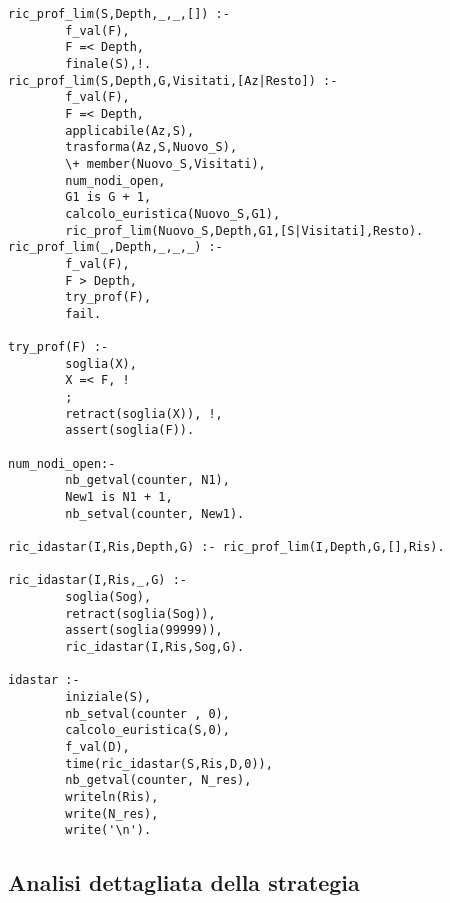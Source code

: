 \begin{lstlisting}
ric_prof_lim(S,Depth,_,_,[]) :-
        f_val(F),
        F =< Depth,
        finale(S),!.
ric_prof_lim(S,Depth,G,Visitati,[Az|Resto]) :-
        f_val(F),
        F =< Depth,
        applicabile(Az,S),
        trasforma(Az,S,Nuovo_S),
        \+ member(Nuovo_S,Visitati),
        num_nodi_open,
        G1 is G + 1,
        calcolo_euristica(Nuovo_S,G1),
        ric_prof_lim(Nuovo_S,Depth,G1,[S|Visitati],Resto).
ric_prof_lim(_,Depth,_,_,_) :-
        f_val(F),
        F > Depth,
        try_prof(F),
        fail.

try_prof(F) :-
        soglia(X),
        X =< F, !
        ;
        retract(soglia(X)), !,
        assert(soglia(F)).

num_nodi_open:-
        nb_getval(counter, N1),
        New1 is N1 + 1,
        nb_setval(counter, New1).

ric_idastar(I,Ris,Depth,G) :- ric_prof_lim(I,Depth,G,[],Ris).

ric_idastar(I,Ris,_,G) :-
        soglia(Sog),
        retract(soglia(Sog)),
        assert(soglia(99999)),
        ric_idastar(I,Ris,Sog,G).

idastar :-
        iniziale(S),
        nb_setval(counter , 0),
        calcolo_euristica(S,0),
        f_val(D),
        time(ric_idastar(S,Ris,D,0)),
        nb_getval(counter, N_res),
        writeln(Ris),
        write(N_res),
        write('\n').
\end{lstlisting}

\subsection{Analisi dettagliata della strategia}

